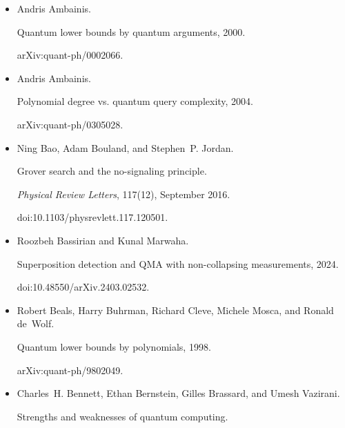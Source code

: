 \documentclass[10pt,a4paper]{article}
\begin{document}
\begin{itemize}
doi:10.48550/arXiv.2403.02543.





\item[] 
[7]

Andris Ambainis.


Quantum lower bounds by quantum arguments, 2000.


arXiv:quant-ph/0002066.





\item[] 
[8]

Andris Ambainis.


Polynomial degree vs. quantum query complexity, 2004.


arXiv:quant-ph/0305028.





\item[] 
[9]

Ning Bao, Adam Bouland, and Stephen P. Jordan.


Grover search and the no-signaling principle.


\emph{Physical Review Letters}, 117(12), September 2016.


doi:10.1103/physrevlett.117.120501.





\item[] 
[10]

Roozbeh Bassirian and Kunal Marwaha.


Superposition detection and QMA with non-collapsing measurements,
2024.


doi:10.48550/arXiv.2403.02532.





\item[] 
[11]

Robert Beals, Harry Buhrman, Richard Cleve, Michele Mosca, and Ronald de Wolf.


Quantum lower bounds by polynomials, 1998.


arXiv:quant-ph/9802049.





\item[] 
[12]

Charles H. Bennett, Ethan Bernstein, Gilles Brassard, and Umesh Vazirani.


Strengths and weaknesses of quantum computing.



\end{itemize}
\end{document}
